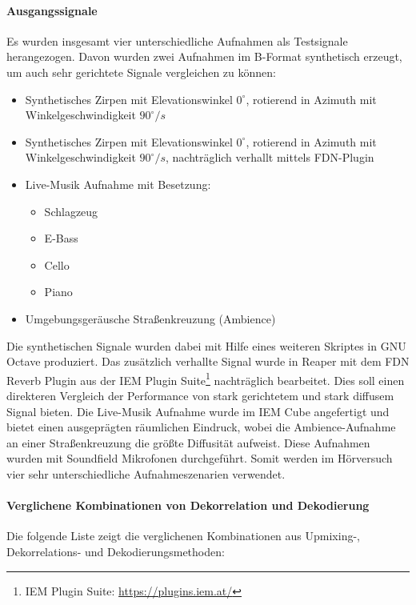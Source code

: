 \paragraph{Ausgangssignale}
Es wurden insgesamt vier unterschiedliche Aufnahmen als Testsignale herangezogen. Davon wurden zwei Aufnahmen im B-Format synthetisch erzeugt, um auch sehr gerichtete Signale vergleichen zu können:

\begin{itemize}
	\item Synthetisches Zirpen mit Elevationswinkel $0^{\circ}$, rotierend in Azimuth mit Winkelgeschwindigkeit $90^{\circ}/s$
	\item Synthetisches Zirpen mit Elevationswinkel $0^{\circ}$, rotierend in Azimuth mit Winkelgeschwindigkeit $90^{\circ}/s$, nachträglich verhallt mittels FDN-Plugin
	\item Live-Musik Aufnahme mit Besetzung:
	\begin{itemize}
	  \item Schlagzeug
	  \item E-Bass
	  \item Cello
	  \item Piano
	\end{itemize}
	\item Umgebungsgeräusche Straßenkreuzung (Ambience)
\end{itemize}

Die synthetischen Signale wurden dabei mit Hilfe eines weiteren Skriptes in GNU Octave produziert. Das zusätzlich verhallte Signal wurde in Reaper mit dem FDN Reverb Plugin aus der IEM Plugin Suite\footnote{IEM Plugin Suite: \url{https://plugins.iem.at/}} nachträglich bearbeitet. Dies soll einen direkteren Vergleich der Performance von stark gerichtetem und stark diffusem Signal bieten. Die Live-Musik Aufnahme wurde im IEM Cube angefertigt und bietet einen ausgeprägten räumlichen Eindruck, wobei die Ambience-Aufnahme an einer Straßenkreuzung die größte Diffusität aufweist. Diese Aufnahmen wurden mit Soundfield Mikrofonen durchgeführt. Somit werden im Hörversuch vier sehr unterschiedliche Aufnahmeszenarien verwendet.


\paragraph{Verglichene Kombinationen von Dekorrelation und Dekodierung}

Die folgende Liste zeigt die verglichenen Kombinationen aus Upmixing-, Dekorrelations- und Dekodierungsmethoden:

